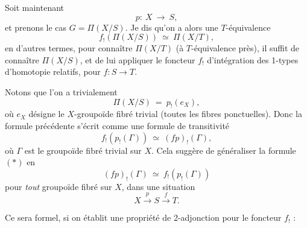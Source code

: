 \documentclass[11pt]{article}
\newcommand{\msp}[1]{\marginpar{\footnotesize [#1]}}
\begin{document}
Soit maintenant
\[ p :\ X \ \longrightarrow\ S, \]
et prenons le cas $G = \Pi(X/S)$. Je dis qu'on a alors une $T$-équivalence
\[ \boxed{\ f_!(\Pi(X/S)) \ \simeq\ \Pi(X/T),\ } \tag*{$(*)$} \]
en d'autres termes, pour connaître $\Pi(X/T)$ (à $T$-équivalence près), il suffit de connaître $\Pi(X/S)$, et de lui appliquer le foncteur $f_!$ d'intégration des 1-types d'homotopie relatifs, pour $f : S \longrightarrow T$.

Notons que l'on a trivialement
\[ \Pi(X/S) \ =\ p_!(e_X), \]
où $e_X$ désigne le $X$-groupoïde fibré trivial (toutes les fibres ponctuelles). Donc la formule précédente s'écrit comme une formule de transitivité
\[ f_!(p_!(\Gamma)) \ \simeq\ (fp)_!(\Gamma), \]
\msp{page 4}
où $\Gamma$ est le groupoïde fibré trivial sur $X$. Cela suggère de généraliser la formule $(*)$ en
\[ \boxed{\ (fp)_!(\Gamma) \ \simeq\ f_!(p_!(\Gamma))\ } \]
pour \textit{tout} groupoïde fibré sur $X$, dans une situation
\[ X \xrightarrow{\ p\ } S \xrightarrow{\ f\ } T. \]

Ce sera formel, si on établit une propriété de 2-adjonction pour le foncteur $f_!$ :
\end{document}
